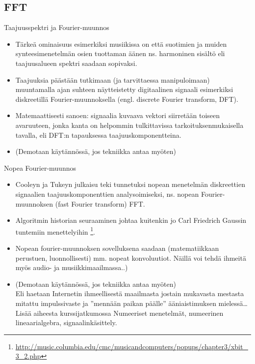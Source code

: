 \documentclass[pdf,9pt,handout]{beamer}
\begin{document}
\subsection{FFT}

\begin{frame}{Taajuusspektri ja Fourier-muunnos}
  \begin{itemize}
\item
  Tärkeä ominaisuus esimerkiksi musiikissa on että suotimien ja muiden
  synteesimenetelmän osien tuottaman äänen ns. harmoninen sisältö eli
  taajuusalueen spektri saadaan sopivaksi.
\item
  Taajuuksia päästään
  tutkimaan (ja tarvittaessa manipuloimaan) muuntamalla ajan suhteen
  näytteistetty digitaalinen signaali esimerkiksi diskreetillä
  Fourier-muunnoksella (engl. discrete Fourier transform,
  DFT).
\item
  Matemaattisesti sanoen: signaalia kuvaava vektori siirretään
  toiseen avaruuteen, jonka kanta on helpommin tulkittavissa
  tarkoituksenmukaisella tavalla, eli DFT:n tapauksessa
  taajuuskomponentteina.
\item[]
  (Demotaan käytännössä, jos tekniikka antaa myöten)
  \end{itemize}
  
\end{frame}

\begin{frame}{Nopea Fourier-muunnos}
\begin{itemize}
\item
  Cooleyn ja Tukeyn julkaisu \cite{CooleyTukey1965fft} teki tunnetuksi
  nopean menetelmän diskreettien signaalien taajuuskomponenttien
  analysoimiseksi, ns. nopean Fourier-muunnoksen (fast Fourier transform)
  FFT.
\item
  Algoritmin historian seuraaminen johtaa kuitenkin jo Carl
  Friedrich Gaussin tuntemiin menettelyihin
  \footnote{\url{http://music.columbia.edu/cmc/musicandcomputers/popups/chapter3/xbit_3_2.php}}.
\item
  Nopean fourier-muunnoksen sovelluksena saadaan (matematiikkaan
  perustuen, luonnollisesti) mm. nopeat konvoluutiot. Näillä voi tehdä
  ihmeitä myös audio- ja musiikkimaailmassa..)
\item[] (Demotaan käytännössä, jos tekniikka antaa myöten)\\ Eli
  haetaan Internetin ihmeellisestä maailmasta jostain mukavasta
  mestasta mitattu impulssivaste ja ''mennään paikan päälle'' ääniaistimuksen
  mielessä\ldots Lisää aiheesta kurssijatkumossa Numeeriset
  menetelmät, numeerinen lineaarialgebra, signaalinkäsittely.
\end{itemize}
\end{frame}
\end{document}
